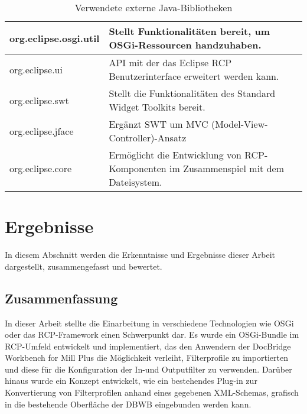 {{{{{\begin{table}[H]
\begin{tabular}{|p{7cm}|p{7cm}|}
    org.eclipse.osgi.util             & Stellt Funktionalitäten bereit, um OSGi-Ressourcen handzuhaben.                                                                                                      \\ \hline
    org.eclipse.ui                    & API mit der das Eclipse RCP Benutzerinterface erweitert werden kann.                                                                                                 \\ \hline
    org.eclipse.swt                   & Stellt die Funktionalitäten des Standard Widget Toolkits bereit.                                                                                                     \\ \hline
    org.eclipse.jface                 & Ergänzt SWT um MVC (Model-View-Controller)-Ansatz                                                                                                                     \\ \hline
    org.eclipse.core                  & Ermöglicht die Entwicklung von RCP-Komponenten im Zusammenspiel mit dem Dateisystem.                                                                                 \\ \hline
    \end{tabular}
    \caption {Verwendete externe Java-Bibliotheken}
    \label{tbl:extern_bibs}
\end{table}


}



}


\section{Ergebnisse}{
\label{sec:ergebnisse}
In diesem Abschnitt werden die Erkenntnisse und Ergebnisse dieser Arbeit dargestellt, zusammengefasst und bewertet.

\subsection{Zusammenfassung}{
\label{sec:zusammenfassung}
In dieser Arbeit stellte die Einarbeitung in verschiedene Technologien wie \ac{OSGi} oder das \ac{RCP}-Framework einen Schwerpunkt dar. Es wurde ein \ac{OSGi}-Bundle im \ac{RCP}-Umfeld entwickelt und implementiert, das den Anwendern der DocBridge\textsuperscript{\textregistered} Workbench for Mill Plus die Möglichkeit verleiht, Filterprofile zu importierten und diese für die Konfiguration der In-und Outputfilter zu verwenden.
Darüber hinaus wurde ein Konzept entwickelt, wie ein bestehendes Plug-in zur Konvertierung von Filterprofilen anhand eines gegebenen XML-Schemas, grafisch in die bestehende Oberfläche der \ac{DBWB} eingebunden werden kann. 
}


}}}}
